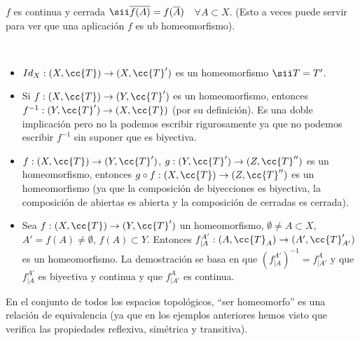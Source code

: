 \begin{observacion}
    $f$ es continua y cerrada $\sii \overline{f(A)}=f(\overline{A})$\ \ $\forall A \subset X$. (Esto a veces puede servir para ver que una aplicación $f$ es ub homeomorfismo).
    \endsquare
\end{observacion}

\begin{ejemplo}\
    \begin{itemize}
        \item $Id_X : (X, \cc{T})\to (X, \cc{T}')$ es un homeomorfismo $\sii T=T'$.
        \item Si $f:(X, \cc{T})\to (Y, \cc{T}')$ es un homeomorfismo, entonces $f^{-1}:(Y, \cc{T}')\to (X, \cc{T})$ (por su definición). Es una doble implicación pero no la podemos escribir rigurosamente ya que no podemos escribir $f^{-1}$ sin suponer que es biyectiva.
        \item $f:(X, \cc{T})\to (Y, \cc{T}')$, $g:(Y, \cc{T}')\to (Z, \cc{T}'')$ es un homeomorfismo, entonces $g\circ f:(X, \cc{T})\to (Z, \cc{T}'')$ es un homeomorfismo (ya que la composición de biyecciones es biyectiva, la composición de abiertas es abierta y la composición de cerradas es cerrada).
        \item Sea $f:(X, \cc{T}) \to (Y, \cc{T}')$ un homeomorfismo, $\emptyset\neq A \subset X$, $A'=f(A)\neq \emptyset$, $f(A)\subset Y$. Entonces $f_{|A}^{A'}:(A, \cc{T}_A)\to (A', \cc{T}_{A'}')$ es un homeomorfismo. La demostración se basa en que $(f_{|A}^{A'})^{-1} = f_{|A'}^A$ y que $f_{|A}^{A'}$ es biyectiva y continua y que $f_{|A'}^A$ es continua.
    \end{itemize}
    \endsquare
\end{ejemplo}

\begin{observacion}
    En el conjunto de todos los espacios topológicos, ``ser homeomorfo'' es una relación de equivalencia (ya que en los ejemplos anteriores hemos visto que verifica las propiedades reflexiva, simétrica y transitiva).
    \endsquare
\end{observacion}

